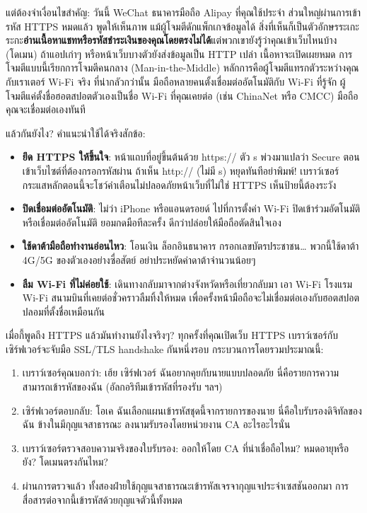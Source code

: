 แต่ต้องจำเงื่อนไขสำคัญ: วันนี้ WeChat ธนาคารมือถือ Alipay ที่คุณใช้ประจำ ส่วนใหญ่ผ่านการเข้ารหัส HTTPS หมดแล้ว พูดให้เห็นภาพ แม้ผู้โจมตีดักแพ็กเกจข้อมูลได้ สิ่งที่เห็นก็เป็นตัวอักษรระเกะระกะ\textbf{อ่านเนื้อหาแชทหรือรหัสชำระเงินของคุณโดยตรงไม่ได้}แต่พวกเขายังรู้ว่าคุณเข้าเว็บไหนบ้าง (โดเมน) ถ้าแอปเก่าๆ หรือหน้าเว็บบางตัวยังส่งข้อมูลเป็น HTTP เปล่า เนื้อหาจะเปิดเผยหมด การโจมตีแบบนี้เรียกการโจมตีคนกลาง (Man-in-the-Middle) หลักการคือผู้โจมตีแทรกตัวระหว่างคุณกับเราเตอร์ Wi-Fi จริง ที่น่ากลัวกว่านั้น มือถือหลายคนตั้งเชื่อมต่ออัตโนมัติกับ Wi-Fi ที่รู้จัก ผู้โจมตีแค่ตั้งชื่อฮอตสปอตตัวเองเป็นชื่อ Wi-Fi ที่คุณเคยต่อ (เช่น ChinaNet หรือ CMCC) มือถือคุณจะเชื่อมต่อเองทันที

แล้วกันยังไง? คำแนะนำใช้ได้จริงสักข้อ:

\begin{itemize}
  \item \textbf{ยึด HTTPS ให้ขึ้นใจ}: หน้าแถบที่อยู่ขึ้นต้นด้วย https:// ตัว s พ่วงมาแปลว่า Secure ตอนเข้าเว็บไซต์ที่ต้องกรอกรหัสผ่าน ถ้าเห็น http:// (ไม่มี s) หยุดทันทีอย่าพิมพ์! เบราว์เซอร์กระแสหลักตอนนี้จะโชว์คำเตือนไม่ปลอดภัยหน้าเว็บที่ไม่ใช่ HTTPS เห็นป้ายนี้ต้องระวัง
  \item \textbf{ปิดเชื่อมต่ออัตโนมัติ}: ไม่ว่า iPhone หรือแอนดรอยด์ ไปที่การตั้งค่า Wi-Fi ปิดเข้าร่วมอัตโนมัติหรือเชื่อมต่ออัตโนมัติ ยอมกดมือทีละครั้ง ดีกว่าปล่อยให้มือถือตัดสินใจเอง
  \item \textbf{ใช้ดาต้ามือถือทำงานอ่อนไหว}: โอนเงิน ล็อกอินธนาคาร กรอกเลขบัตรประชาชน… พวกนี้ใช้ดาต้า 4G/5G ของตัวเองอย่างซื่อสัตย์ อย่าประหยัดค่าดาต้าจำนวนน้อยๆ
  \item \textbf{ลืม Wi-Fi ที่ไม่ค่อยใช้}: เดินทางกลับมาจากต่างจังหวัดหรือเที่ยวกลับมา เอา Wi-Fi โรงแรม Wi-Fi สนามบินที่เคยต่อชั่วคราวลืมทิ้งให้หมด เพื่อครั้งหน้ามือถือจะไม่เชื่อมต่อเองกับฮอตสปอตปลอมที่ตั้งชื่อเหมือนกัน
\end{itemize}


เมื่อกี้พูดถึง HTTPS แล้วมันทำงานยังไงจริงๆ? ทุกครั้งที่คุณเปิดเว็บ HTTPS เบราว์เซอร์กับเซิร์ฟเวอร์จะจับมือ SSL/TLS handshake กันหนึ่งรอบ กระบวนการโดยรวมประมาณนี้:

\begin{enumerate}
  \item เบราว์เซอร์คุณบอกว่า: เฮ้ย เซิร์ฟเวอร์ ฉันอยากคุยกับนายแบบปลอดภัย นี่คือรายการความสามารถเข้ารหัสของฉัน (อัลกอริทึมเข้ารหัสที่รองรับ ฯลฯ)
  \item เซิร์ฟเวอร์ตอบกลับ: โอเค ฉันเลือกแผนเข้ารหัสชุดนี้จากรายการของนาย นี่คือใบรับรองดิจิทัลของฉัน ข้างในมีกุญแจสาธารณะ ลงนามรับรองโดยหน่วยงาน CA อะไรอะไรนั่น
  \item เบราว์เซอร์ตรวจสอบความจริงของใบรับรอง: ออกให้โดย CA ที่น่าเชื่อถือไหม? หมดอายุหรือยัง? โดเมนตรงกันไหม?
  \item ผ่านการตรวจแล้ว ทั้งสองฝ่ายใช้กุญแจสาธารณะเข้ารหัสเจรจากุญแจประจำเซสชันออกมา การสื่อสารต่อจากนี้เข้ารหัสด้วยกุญแจตัวนี้ทั้งหมด
\end{enumerate}

